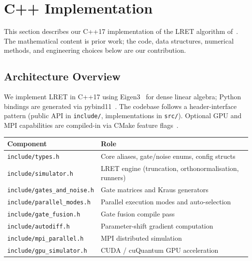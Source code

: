 \documentclass[11pt,a4paper]{article}
\begin{document}
\section{C++ Implementation}
\label{sec:cpp}

This section describes our C++17 implementation of the LRET algorithm
of~\cite{chen2021lret}. The mathematical content is prior work; the code, data
structures, numerical methods, and engineering choices below are our contribution.

\subsection{Architecture Overview}

We implement LRET in C++17 using Eigen3~\cite{eigen2010} for dense linear algebra;
Python bindings are generated via pybind11~\cite{pybind11}. The codebase follows a
header-interface pattern (public API in \texttt{include/}, implementations in
\texttt{src/}). Optional GPU and MPI capabilities are compiled-in via CMake feature
flags~\cite{cmake}.

\begin{center}
\renewcommand{\arraystretch}{1.2}
\begin{tabular}{@{}lp{9cm}@{}}
\toprule
\textbf{Component} & \textbf{Role} \\
\midrule
\texttt{include/types.h}             & Core aliases, gate/noise enums, config structs \\
\texttt{include/simulator.h}         & LRET engine (truncation, orthonormalisation, runners) \\
\texttt{include/gates\_and\_noise.h} & Gate matrices and Kraus generators \\
\texttt{include/parallel\_modes.h}   & Parallel execution modes and auto-selection \\
\texttt{include/gate\_fusion.h}      & Gate fusion compile pass \\
\texttt{include/autodiff.h}          & Parameter-shift gradient computation \\
\texttt{include/mpi\_parallel.h}     & MPI distributed simulation \\
\texttt{include/gpu\_simulator.h}    & CUDA / cuQuantum GPU acceleration \\
\bottomrule
\end{tabular}
\end{center}
\end{document}
